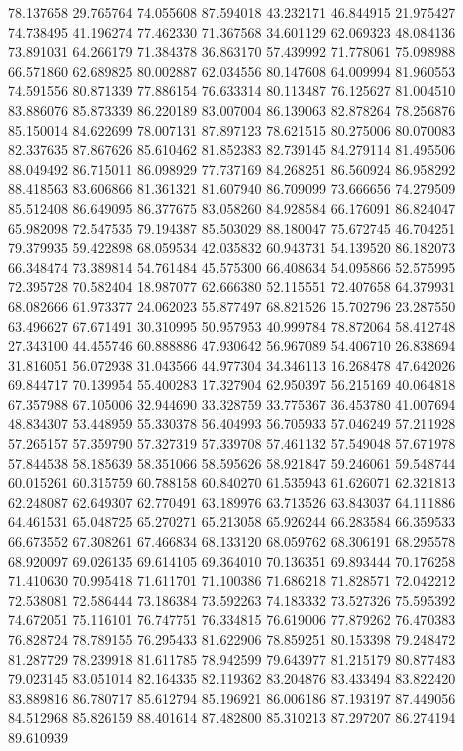 78.137658
29.765764
74.055608
87.594018
43.232171
46.844915
21.975427
74.738495
41.196274
77.462330
71.367568
34.601129
62.069323
48.084136
73.891031
64.266179
71.384378
36.863170
57.439992
71.778061
75.098988
66.571860
62.689825
80.002887
62.034556
80.147608
64.009994
81.960553
74.591556
80.871339
77.886154
76.633314
80.113487
76.125627
81.004510
83.886076
85.873339
86.220189
83.007004
86.139063
82.878264
78.256876
85.150014
84.622699
78.007131
87.897123
78.621515
80.275006
80.070083
82.337635
87.867626
85.610462
81.852383
82.739145
84.279114
81.495506
88.049492
86.715011
86.098929
77.737169
84.268251
86.560924
86.958292
88.418563
83.606866
81.361321
81.607940
86.709099
73.666656
74.279509
85.512408
86.649095
86.377675
83.058260
84.928584
66.176091
86.824047
65.982098
72.547535
79.194387
85.503029
88.180047
75.672745
46.704251
79.379935
59.422898
68.059534
42.035832
60.943731
54.139520
86.182073
66.348474
73.389814
54.761484
45.575300
66.408634
54.095866
52.575995
72.395728
70.582404
18.987077
62.666380
52.115551
72.407658
64.379931
68.082666
61.973377
24.062023
55.877497
68.821526
15.702796
23.287550
63.496627
67.671491
30.310995
50.957953
40.999784
78.872064
58.412748
27.343100
44.455746
60.888886
47.930642
56.967089
54.406710
26.838694
31.816051
56.072938
31.043566
44.977304
34.346113
16.268478
47.642026
69.844717
70.139954
55.400283
17.327904
62.950397
56.215169
40.064818
67.357988
67.105006
32.944690
33.328759
33.775367
36.453780
41.007694
48.834307
53.448959
55.330378
56.404993
56.705933
57.046249
57.211928
57.265157
57.359790
57.327319
57.339708
57.461132
57.549048
57.671978
57.844538
58.185639
58.351066
58.595626
58.921847
59.246061
59.548744
60.015261
60.315759
60.788158
60.840270
61.535943
61.626071
62.321813
62.248087
62.649307
62.770491
63.189976
63.713526
63.843037
64.111886
64.461531
65.048725
65.270271
65.213058
65.926244
66.283584
66.359533
66.673552
67.308261
67.466834
68.133120
68.059762
68.306191
68.295578
68.920097
69.026135
69.614105
69.364010
70.136351
69.893444
70.176258
71.410630
70.995418
71.611701
71.100386
71.686218
71.828571
72.042212
72.538081
72.586444
73.186384
73.592263
74.183332
73.527326
75.595392
74.672051
75.116101
76.747751
76.334815
76.619006
77.879262
76.470383
76.828724
78.789155
76.295433
81.622906
78.859251
80.153398
79.248472
81.287729
78.239918
81.611785
78.942599
79.643977
81.215179
80.877483
79.023145
83.051014
82.164335
82.119362
83.204876
83.433494
83.822420
83.889816
86.780717
85.612794
85.196921
86.006186
87.193197
87.449056
84.512968
85.826159
88.401614
87.482800
85.310213
87.297207
86.274194
89.610939
